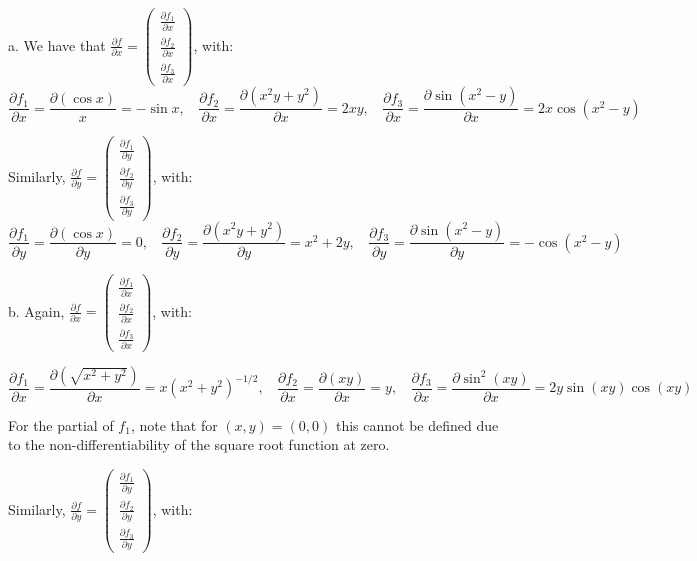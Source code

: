\begin{solution}

    a. We have that $\frac{\partial f}{\partial x} = \begin{pmatrix}
        \frac{\partial f_1}{\partial x} \\
        \frac{\partial f_2}{\partial x} \\
        \frac{\partial f_3}{\partial x}
    \end{pmatrix}$, with:
    $$\frac{\partial f_1}{\partial x} = \frac{\partial (\cos x)}{x} = -\sin x,\ \ \ \ \frac{\partial f_2}{\partial x} = \frac{\partial (x^2y + y^2)}{\partial x} = 2xy,\ \ \ \ \frac{\partial f_3}{\partial x} = \frac{\partial \sin (x^2 -y)}{\partial x} = 2x\cos (x^2 - y)$$

    Similarly, $\frac{\partial f}{\partial y } = \begin{pmatrix}
        \frac{\partial f_1}{\partial y} \\
        \frac{\partial f_2}{\partial y} \\
        \frac{\partial f_3}{\partial y}
    \end{pmatrix}$, with:
    $$\frac{\partial f_1}{\partial y} = \frac{\partial (\cos x)}{\partial y} = 0,\ \ \ \ \frac{\partial f_2}{\partial y} = \frac{\partial (x^2y + y^2)}{\partial y} = x^2 + 2y,\ \ \ \ \frac{\partial f_3}{\partial y} = \frac{\partial \sin (x^2 -y)}{\partial y} = -\cos (x^2 - y)$$

    b. Again, $\frac{\partial f}{\partial x} = \begin{pmatrix}
        \frac{\partial f_1}{\partial x} \\
        \frac{\partial f_2}{\partial x} \\
        \frac{\partial f_3}{\partial x}
    \end{pmatrix}$, with:

    $$\frac{\partial f_1}{\partial x} = \frac{\partial (\sqrt{x^2 + y^2})}{\partial x} = x(x^2 +y^2)^{-1/2},\ \ \ \ \frac{\partial f_2}{\partial x} = \frac{\partial (xy)}{\partial x} = y,\ \ \ \ \frac{\partial f_3}{\partial x} = \frac{\partial \sin^2 (xy)}{\partial x} = 2y\sin (xy) \cos(xy)$$

    For the partial of $f_1$, note that for $(x, y) = (0, 0)$ this cannot be defined due to the non-differentiability of the square root function at zero.

    Similarly, $\frac{\partial f}{\partial y } = \begin{pmatrix}
        \frac{\partial f_1}{\partial y} \\
        \frac{\partial f_2}{\partial y} \\
        \frac{\partial f_3}{\partial y}
    \end{pmatrix}$, with:


\end{solution}
